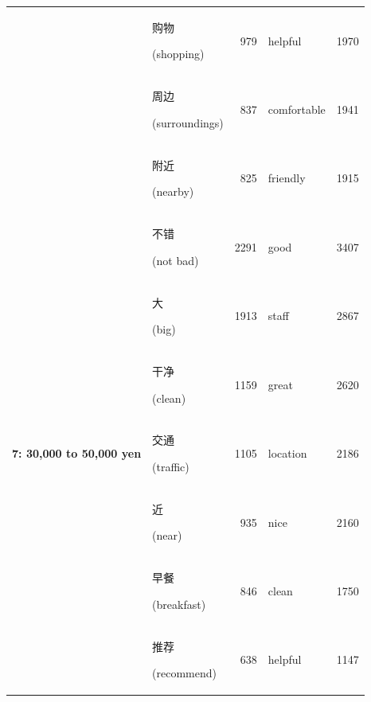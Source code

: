 \documentclass[smallextended,natbib]{svjour3}       %
\begin{document}
\begin{table}[ht]
{\begin{tabular}{|c|lr|lr|}
                                                             & \begin{CJK}{UTF8}{gbsn}购物\end{CJK} (shopping)        & 979   & helpful     & 1970  \\  
                                                             & \begin{CJK}{UTF8}{gbsn}周边\end{CJK} (surroundings)    & 837   & comfortable & 1941  \\  
                                                             & \begin{CJK}{UTF8}{gbsn}附近\end{CJK} (nearby)          & 825   & friendly    & 1915  \\ \hline
        \multirow{10}{*}{\textbf{7: 30,000 to 50,000 yen}}   & \begin{CJK}{UTF8}{gbsn}不错\end{CJK} (not bad)         & 2291  & good        & 3407  \\  
                                                             & \begin{CJK}{UTF8}{gbsn}大\end{CJK} (big)              & 1913  & staff       & 2867  \\  
                                                             & \begin{CJK}{UTF8}{gbsn}干净\end{CJK} (clean)           & 1159  & great       & 2620  \\  
                                                             & \begin{CJK}{UTF8}{gbsn}交通\end{CJK} (traffic)         & 1105  & location    & 2186  \\  
                                                             & \begin{CJK}{UTF8}{gbsn}近\end{CJK} (near)             & 935   & nice        & 2160  \\  
                                                             & \begin{CJK}{UTF8}{gbsn}早餐\end{CJK} (breakfast)       & 846   & clean       & 1750  \\  
                                                             & \begin{CJK}{UTF8}{gbsn}推荐\end{CJK} (recommend)       & 638   & helpful     & 1147  \\  

\end{tabular}}
\end{table}
\end{document}

